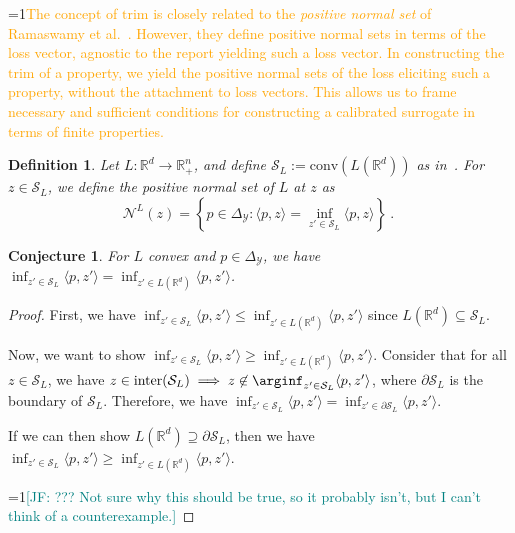 \documentclass[11pt]{article}
\newcommand{\Comments}{1}
\newcommand{\mynote}[2]{\ifnum\Comments=1\textcolor{#1}{#2}\fi}
\newcommand{\jessie}[1]{\mynote{teal}{[JF: #1]}}
\newcommand{\proposedadd}[1]{\mynote{orange}{#1}}
\newcommand{\reals}{\mathbb{R}}
\newcommand{\simplex}{\Delta_\Y}
\newcommand{\N}{\mathcal{N}}
\newcommand{\Sc}{\mathcal{S}}
\newcommand{\Y}{\mathcal{Y}}
\newcommand{\inprod}[2]{\langle #1, #2 \rangle}%
\newcommand{\inter}{\mathrm{inter}}
\newcommand{\trim}{\mathrm{trim}}
\newcommand{\conv}{\mathrm{conv}}
\newtheorem{conjecture}{Conjecture}
\newtheorem{definition}{Definition}
\begin{document}
\proposedadd{The concept of $\trim$ is closely related to the \emph{positive normal set} of Ramaswamy et al.~\cite{ramaswamy2016convex}.
However, they define positive normal sets in terms of the loss vector, agnostic to the report yielding such a loss vector.
In constructing the $\trim$ of a property, we yield the positive normal sets of the loss eliciting such a property, without the attachment to loss vectors.
This allows us to frame necessary and sufficient conditions for constructing a calibrated surrogate in terms of finite properties.}


\begin{definition}
	Let $L:\reals^d \to \reals^n_+$, and define $\Sc_L := \conv(L(\reals^d))$ as in~\cite[Definition 8]{ramaswamy2016convex}.
	For $z \in \Sc_L$, we define the \emph{positive normal set} of $L$ at $z$ as
	\begin{equation}
	\N^L(z) = \left\{ p \in \simplex: \inprod{p}{z} = \inf_{z' \in \Sc_L} \inprod{p}{z} \right\}~.~
	\end{equation}
\end{definition}

\begin{conjecture}
	For $L$ convex and $p \in \simplex$, we have $\inf_{z' \in \Sc_L} \inprod{p}{z'} = \inf_{z' \in L(\reals^d)}\inprod{p}{z'}$.
\end{conjecture}
\begin{proof}
	First, we have $\inf_{z' \in \Sc_L} \inprod{p}{z'} \leq \inf_{z' \in L(\reals^d)}\inprod{p}{z'}$ since $L(\reals^d) \subseteq \Sc_L$.
	
	Now, we want to show $\inf_{z' \in \Sc_L} \inprod{p}{z'} \geq \inf_{z' \in L(\reals^d)}\inprod{p}{z'}$.
	Consider that for all $z \in \Sc_L$, we have $z \in \inter(\Sc_L) \implies z \not \in \arginf_{z' \in \Sc_L}\inprod{p}{z'}$, where $\partial \Sc_L$ is the boundary of $\Sc_L$.
	Therefore, we have $\inf_{z' \in \Sc_L}\inprod{p}{z'} = \inf_{z' \in \partial\Sc_L}\inprod{p}{z'}$.
	
	If we can then show $L(\reals^d) \supseteq \partial \Sc_L$, then we have $\inf_{z' \in \Sc_L} \inprod{p}{z'} \geq \inf_{z' \in L(\reals^d)}\inprod{p}{z'}$.

	\jessie{??? Not sure why this should be true, so it probably isn't, but I can't think of a counterexample.}
\end{proof}
\end{document}
